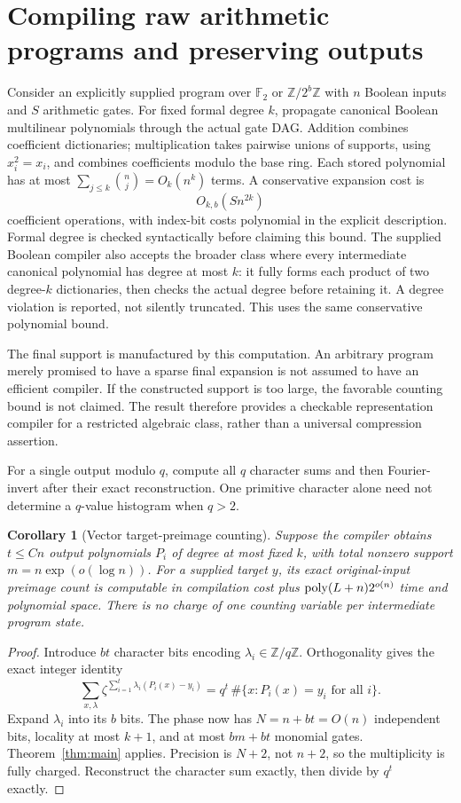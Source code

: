 \documentclass[11pt,a4paper]{article}
\newtheorem{corollary}[theorem]{Corollary}
\theoremstyle{remark}\newtheorem{remark}[theorem]{Remark}
\newcommand{\F}{\mathbb F}\newcommand{\Q}{\mathbb Q}\newcommand{\Z}{\mathbb Z}
\begin{document}
\section{Compiling raw arithmetic programs and preserving outputs}
Consider an explicitly supplied program over $\F_2$ or $\Z/2^b\Z$ with
$n$ Boolean inputs and $S$ arithmetic gates. For fixed formal degree $k$,
propagate canonical Boolean multilinear polynomials through the actual
gate DAG. Addition combines coefficient dictionaries; multiplication
takes pairwise unions of supports, using $x_i^2=x_i$, and combines
coefficients modulo the base ring. Each stored polynomial has at most
$\sum_{j\le k}\binom nj=O_k(n^k)$ terms. A conservative expansion cost is
\[
 O_{k,b}(S n^{2k})
\]
coefficient operations, with index-bit costs polynomial in the explicit
description. Formal degree is checked syntactically before claiming this
bound. The supplied Boolean compiler also accepts the broader class where
every intermediate canonical polynomial has degree at most $k$: it fully
forms each product of two degree-$k$ dictionaries, then checks the actual
degree before retaining it. A degree violation is reported, not silently
truncated. This uses the same conservative polynomial bound.

The final support is manufactured by this computation. An arbitrary
program merely promised to have a sparse final expansion is not assumed
to have an efficient compiler. If the constructed support is too large,
the favorable counting bound is not claimed. The result therefore
provides a checkable representation compiler for a restricted algebraic
class, rather than a universal compression assertion.

For a single output modulo $q$, compute all $q$ character sums and then
Fourier-invert after their exact reconstruction. One primitive character
alone need not determine a $q$-value histogram when $q>2$.

\begin{corollary}[Vector target-preimage counting]\label{cor:program}
Suppose the compiler obtains $t\le Cn$ output polynomials $P_i$ of degree
at most fixed $k$, with total nonzero support $m=n\exp(o(\log n))$.
For a supplied target $y$, its exact original-input preimage count is
computable in compilation cost plus $\operatorname{poly}(L+n)2^{o(n)}$ time and
polynomial space. There is no charge of one counting variable per
intermediate program state.
\end{corollary}
\begin{proof}
Introduce $bt$ character bits encoding $\lambda_i\in\Z/q\Z$. Orthogonality
gives the exact integer identity
\[
 \sum_{x,\lambda}\zeta^{\sum_{i=1}^t\lambda_i(P_i(x)-y_i)}
 =q^t\,\#\{x:P_i(x)=y_i\text{ for all }i\}.
\]
Expand $\lambda_i$ into its $b$ bits. The phase now has
$N=n+bt=O(n)$ independent bits, locality at most $k+1$, and at most
$bm+bt$ monomial gates. Theorem~\ref{thm:main} applies. Precision is
$N+2$, not $n+2$, so the multiplicity is fully charged. Reconstruct
the character sum exactly, then divide by $q^t$ exactly.
\end{proof}
\end{document}
